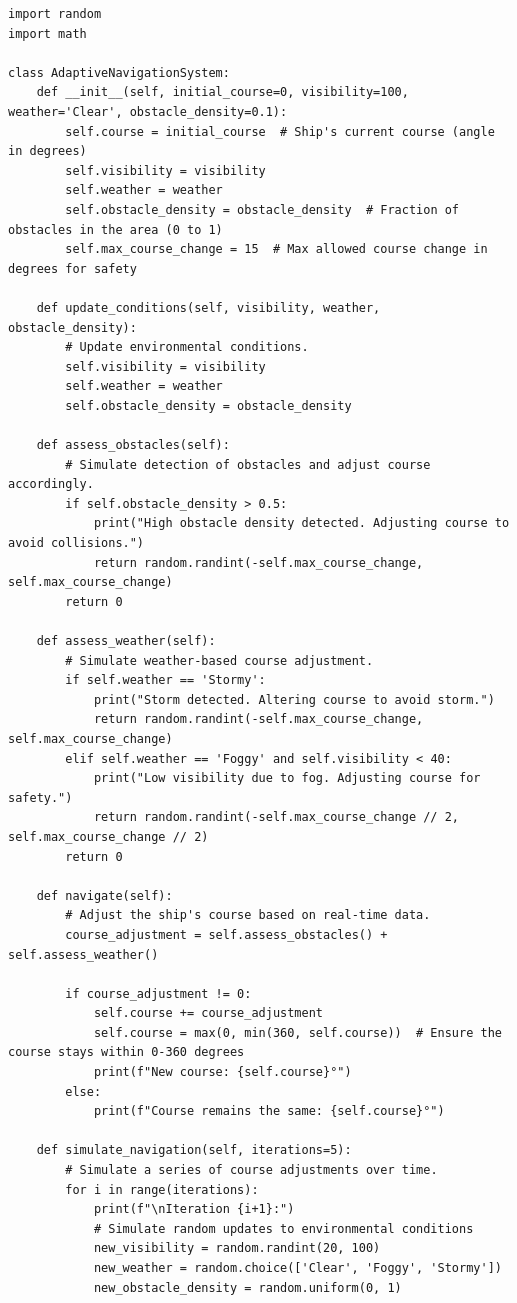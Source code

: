 \documentclass{article}
\begin{document}
\begin{verbatim}
import random
import math

class AdaptiveNavigationSystem:
    def __init__(self, initial_course=0, visibility=100, weather='Clear', obstacle_density=0.1):
        self.course = initial_course  # Ship's current course (angle in degrees)
        self.visibility = visibility  
        self.weather = weather 
        self.obstacle_density = obstacle_density  # Fraction of obstacles in the area (0 to 1)
        self.max_course_change = 15  # Max allowed course change in degrees for safety

    def update_conditions(self, visibility, weather, obstacle_density):
        # Update environmental conditions.
        self.visibility = visibility
        self.weather = weather
        self.obstacle_density = obstacle_density

    def assess_obstacles(self):
        # Simulate detection of obstacles and adjust course accordingly.
        if self.obstacle_density > 0.5:  
            print("High obstacle density detected. Adjusting course to avoid collisions.")
            return random.randint(-self.max_course_change, self.max_course_change)
        return 0  

    def assess_weather(self):
        # Simulate weather-based course adjustment.
        if self.weather == 'Stormy': 
            print("Storm detected. Altering course to avoid storm.")
            return random.randint(-self.max_course_change, self.max_course_change)
        elif self.weather == 'Foggy' and self.visibility < 40:
            print("Low visibility due to fog. Adjusting course for safety.")
            return random.randint(-self.max_course_change // 2, self.max_course_change // 2)
        return 0  

    def navigate(self):
        # Adjust the ship's course based on real-time data.
        course_adjustment = self.assess_obstacles() + self.assess_weather()

        if course_adjustment != 0:
            self.course += course_adjustment
            self.course = max(0, min(360, self.course))  # Ensure the course stays within 0-360 degrees
            print(f"New course: {self.course}°")
        else:
            print(f"Course remains the same: {self.course}°")
        
    def simulate_navigation(self, iterations=5):
        # Simulate a series of course adjustments over time.
        for i in range(iterations):
            print(f"\nIteration {i+1}:")
            # Simulate random updates to environmental conditions
            new_visibility = random.randint(20, 100)
            new_weather = random.choice(['Clear', 'Foggy', 'Stormy'])
            new_obstacle_density = random.uniform(0, 1)
            

\end{verbatim}
\end{document}
